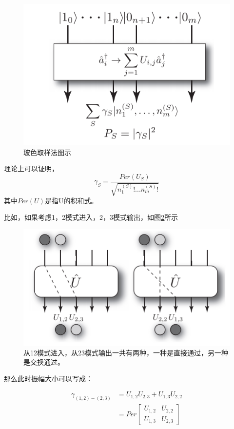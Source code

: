 \begin{figure}[ht]
	\centering
	\includegraphics[scale=0.3]{pic/BS}
	\caption{玻色取样法图示}
	\label{fig:BS}
\end{figure}

理论上可以证明，\[\gamma_S=\frac{Per(U_S)}{\sqrt{n_1^{(S)}!...n_m^{(S)}!}}\]
其中$Per(U)$是指U的积和式。


比如，如果考虑1，2模式进入，2，3模式输出，如图\ref{fig:1223}所示

\begin{figure}[ht]
	\centering
	\includegraphics[scale=0.3]{pic/1223}
	\caption{从12模式进入，从23模式输出一共有两种，一种是直接通过，另一种是交换通过。}
	\label{fig:1223}
\end{figure}

那么此时振幅大小可以写成：

\begin{align*}
\gamma_{(1,2)-(2,3)}
&=U_{1,2}U_{2,3}+U_{1,3}U_{2,2}   \\
&= Per \left[\begin{matrix}
   U_{1,2} & U_{2,2}  \\
   U_{1,3} & U_{2,3}
  \end{matrix}
  \right]
\end{align*}

